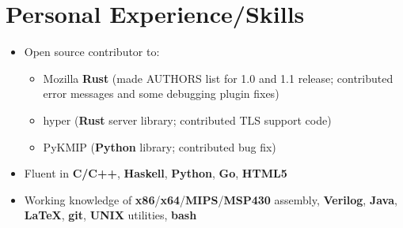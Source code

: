 \documentclass{my_resume}
\begin{document}
\section{Personal Experience/Skills}
\begin{itemize}
	\item Open source contributor to:
	\begin{itemize}
		\item Mozilla \textbf{Rust} (made AUTHORS list for 1.0 and 1.1 release;
			contributed error messages and some debugging plugin fixes)
		\item hyper (\textbf{Rust} server library; contributed TLS support code)
		\item PyKMIP (\textbf{Python} library; contributed bug fix)
	\end{itemize}
	\item Fluent in \textbf{C/C++}, \textbf{Haskell}, \textbf{Python},
		\textbf{Go}, \textbf{HTML5}
	\item Working knowledge of \textbf{x86}/\textbf{x64}/\textbf{MIPS}/\textbf{MSP430} assembly,
		\textbf{Verilog}, \textbf{Java}, \textbf{LaTeX}, \textbf{git}, \textbf{UNIX} utilities, \textbf{bash}
\end{itemize}
\end{document}
